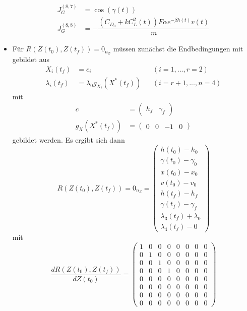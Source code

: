 \begin{itemize}
\begin{align}
J_G^{(8,7)} &= \cos(\gamma(t)) \\
J_G^{(8,8)} &= - \dfrac{(C_{D_0} + k C_L^2(t)) F \alpha e^{-\beta h(t)} v(t)}{m} 
\end{align}
%
\item Für $R(Z(t_0),Z(t_f)) = 0_{n_Z}$ müssen zunächst die Endbedingungen mit gebildet aus
\begin{align*}
X_i(t_f) &= c_i & & (i=1,...,r=2) \\
\lambda_i(t_f) &= \lambda_0 g_{X_i}(X^{\ast}(t_f)) & &(i=r+1,...,n=4)
\end{align*}
mit
\begin{align*}
c &= \begin{pmatrix} h_f & \gamma_f \end{pmatrix} \\
g_{X}(X^{\ast}(t_f)) &= \begin{pmatrix} 0 & 0 & -1 & 0 \end{pmatrix}
\end{align*}
gebildet werden. Es ergibt sich dann
\begin{equation}
R(Z(t_0),Z(t_f)) = 0_{n_Z} = \begin{pmatrix}
h(t_0) - h_0 \\ 
\gamma(t_0) - \gamma_0 \\
x(t_0) - x_0 \\ 
v(t_0) - v_0 \\ 
h(t_f) - h_f \\ 
\gamma(t_f) - \gamma_f \\
\lambda_3(t_f) + \lambda_0 \\ 
\lambda_4(t_f) - 0
\end{pmatrix}
\end{equation}
mit 
\begin{equation}
\dfrac{d R(Z(t_0),Z(t_f))}{d Z(t_0)} = \begin{pmatrix}
1 & 0 & 0 & 0 & 0 & 0 & 0 & 0 \\ 
0 & 1 & 0 & 0 & 0 & 0 & 0 & 0 \\ 
0 & 0 & 1 & 0 & 0 & 0 & 0 & 0 \\ 
0 & 0 & 0 & 1 & 0 & 0 & 0 & 0 \\
0 & 0 & 0 & 0 & 0 & 0 & 0 & 0 \\
0 & 0 & 0 & 0 & 0 & 0 & 0 & 0 \\
0 & 0 & 0 & 0 & 0 & 0 & 0 & 0 \\
0 & 0 & 0 & 0 & 0 & 0 & 0 & 0
\end{pmatrix}
\end{equation}
\begin{equation}

\end{equation}
\end{itemize}
